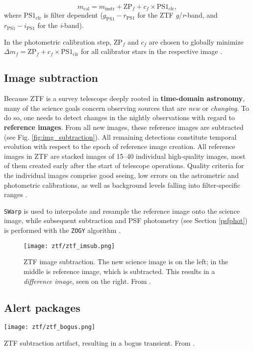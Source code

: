 \begin{equation}
m_\text{cal} = m_\text{instr} + \text{ZP}_f + c_f \times \text{PS1}_\text{clr},
\end{equation}
where $\text{PS1}_\text{clr}$ is filter dependent ($g_\text{PS1}-r_\text{PS1}$ for the ZTF \textit{g}/\textit{r}-band, and $r_\text{PS1}-i_\text{PS1}$ for the \textit{i}-band).

In the photometric calibration step, $\text{ZP}_f$ and $c_f$ are chosen to globally minimize $\Delta m_f = \text{ZP}_f + c_f \times \text{PS1}_\text{clr}$ for all calibrator stars in the respective image \cite{Masci2019a}.

\subsection{Image subtraction} \label{ztf_image_subtraction}
Because ZTF is a survey telescope deeply rooted in \textbf{time-domain astronomy}, many of the science goals concern observing sources that are \textit{new} or \textit{changing}. To do so, one needs to detect changes in the nightly observations with regard to \textbf{reference images}. From all new images, these reference images are subtracted (see Fig. \ref{fig:img_subtraction}). All remaining detections constitute temporal evolution with respect to the epoch of reference image creation. All reference images in ZTF are stacked images of 15--40 individual high-quality images, most of them created early after the start of telescope operations. Quality criteria for the individual images comprise good seeing, low errors on the astrometric and photometric calibrations, as well as background levels falling into filter-specific ranges \cite{Masci2019}.

\texttt{SWarp}  is used to interpolate and resample the reference image onto the science image, while subsequent subtraction and PSF photometry (see Section \ref{psfphot}) is performed with the \texttt{ZOGY} algorithm .

\begin{figure}[h!]
    \texttt{[image: ztf/ztf\_imsub.png]}
    \caption[ZTF image subtraction]{ZTF image subtraction. The new science image is on the left; in the middle is reference image, which is subtracted. This results in a \textit{difference image}, seen on the right. From \cite{Mahabal2019}.}
\end{figure}

\subsection{Alert packages} \label{ztf_alerts}
\begin{marginfigure}
    \texttt{[image: ztf/ztf\_bogus.png]}
    \caption[ZTF subtraction artifact]{ZTF subtraction artifact, resulting in a bogus transient. From \cite{Mahabal2019}.}
\end{marginfigure}

